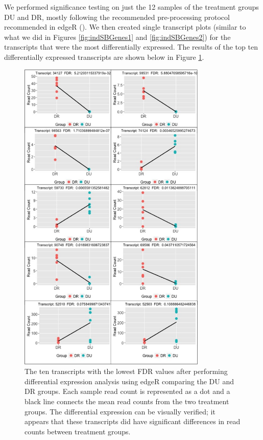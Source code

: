 \documentclass[11pt,a4paper,oldfontcommands,openany]{memoir}
\numberwithin{equation}{section} %
\begin{document}
We performed significance testing on just the 12 samples of the treatment groups DU and DR, mostly following the recommended pre-processing protocol recommended in edgeR (\citealt{edger}). We then created single transcript plots (similar to what we did in Figures \ref{fig:indSBGenes1} and \ref{fig:indSBGenes2}) for the transcripts that were the most differentially expressed. The results of the top ten differentially expressed transcripts are shown below in Figure \ref{fig:degPW}.

\clearpage

\begin{figure}[H]
    \centering
    \includegraphics[width=0.8\textwidth]{degPW}
    \caption{The ten transcripts with the lowest FDR values after performing differential expression analysis using edgeR comparing the DU and DR groups. Each sample read count is represented as a dot and a black line connects the mean read counts from the two treatment groups. The differential expression can be visually verified; it appears that these transcripts did have significant differences in read counts between treatment groups.}
    \label{fig:degPW}
\end{figure}
\end{document}
